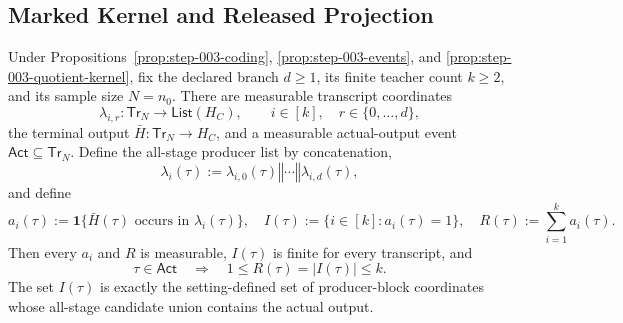 \subsection{Marked Kernel and Released Projection}\label{app:step_004}


 \begin{lemma}\label{lem:step-004-occurrence}
Under  Propositions~\ref{prop:step-003-coding},
\ref{prop:step-003-events}, and
\ref{prop:step-003-quotient-kernel}, fix the declared branch \(d\geq1\),
its finite teacher count \(k\geq2\), and its sample size \(N=n_0\). There
are measurable transcript coordinates
\[
\lambda_{i,r}:\mathsf{Tr}_N\longrightarrow
\mathsf{List}(H_C),
\qquad i\in[k],\quad r\in\{0,\ldots,d\},
\tag{2}
\]
the terminal output \(\bar H:\mathsf{Tr}_N\to H_C\), and a measurable
actual-output event \(\mathsf{Act}\subseteq\mathsf{Tr}_N\). Define the
all-stage producer list by concatenation,
\[
\lambda_i(\tau)
:=\lambda_{i,0}(\tau)\mathbin{\Vert}\cdots
  \mathbin{\Vert}\lambda_{i,d}(\tau),
\tag{3}
\]
and define
\[
a_i(\tau):=
\mathbf1\{\bar H(\tau)\text{ occurs in }\lambda_i(\tau)\},
\quad
I(\tau):=\{i\in[k]:a_i(\tau)=1\},
\quad
R(\tau):=\sum_{i=1}^k a_i(\tau).
\tag{4}
\]
Then every \(a_i\) and \(R\) is measurable, \(I(\tau)\) is finite for
every transcript, and
\[
\tau\in\mathsf{Act}\quad\Longrightarrow\quad
1\leq R(\tau)=|I(\tau)|\leq k.
\tag{5}
\]
The set \(I(\tau)\) is exactly the setting-defined set of producer-block
coordinates whose all-stage candidate union contains the actual output.


\end{lemma}


